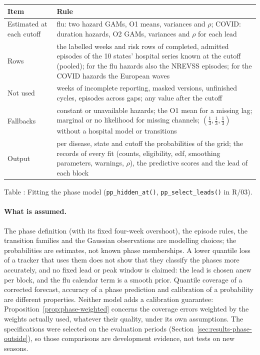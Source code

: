 \documentclass[11pt,a4paper]{article}
\theoremstyle{definition}
\theoremstyle{remark}
\begin{document}
\begin{center}
\small
\begin{tabularx}{\linewidth}{@{}p{2.8cm}X@{}}
\toprule
Item & Rule\\
\midrule
Estimated at each cutoff & flu: two hazard GAMs, O1 means, variances and
$\rho$; COVID: duration hazards, O2 GAMs, variances and $\rho$ for each lead\\
Rows & the labelled weeks and risk rows of completed, admitted episodes of
the 10 states' hospital series known at the cutoff (pooled); for the flu
hazards also the NREVSS episodes; for the COVID hazards the European waves\\
Not used & weeks of incomplete reporting, masked versions, unfinished cycles,
episodes across gaps; any value after the cutoff\\
Fallbacks & constant or unavailable hazards; the O1 mean for a missing lag;
marginal or no likelihood for missing channels; $(\frac13,\frac13,\frac13)$
without a hospital model or transitions\\
Output & per disease, state and cutoff the probabilities of the grid; the
records of every fit (counts, eligibility, edf, smoothing parameters,
warnings, $\rho$), the predictive scores and the lead of each block\\
\bottomrule
\end{tabularx}
\end{center}
\label{tab:phase-fitting}
\begin{center}\small Table \thetable: Fitting the phase model
(\texttt{pp\_hidden\_at()}, \texttt{pp\_select\_leads()} in R/03).
\end{center}

\paragraph{What is assumed.}
The phase definition (with its fixed four-week overshoot), the episode
rules, the transition families and the Gaussian observations are modelling
choices; the probabilities are estimates, not known phase memberships. A
lower quantile loss of a tracker that uses them does not show that they
classify the phases more accurately, and no fixed lead or peak window is
claimed: the lead is chosen anew per block, and the flu calendar term is a
smooth prior. Quantile coverage of a corrected forecast, accuracy of a phase
prediction and calibration of a probability are different properties.
Neither model adds a calibration guarantee:
Proposition~\ref{prop:phase-weighted} concerns the coverage errors weighted by
the weights actually used, whatever their quality, under its own
assumptions. The specifications were selected on the evaluation periods
(Section~\ref{sec:results-phase-outside}), so those comparisons are
development evidence, not tests on new seasons.
\end{document}
